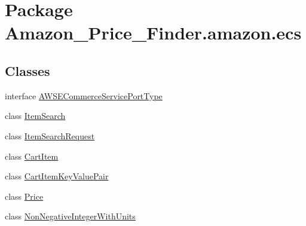\hypertarget{namespace_amazon___price___finder_1_1amazon_1_1ecs}{\section{Package Amazon\-\_\-\-Price\-\_\-\-Finder.\-amazon.\-ecs}
\label{namespace_amazon___price___finder_1_1amazon_1_1ecs}
}
\subsection*{Classes}
\begin{DoxyCompactItemize}
\item 
interface \hyperlink{interface_amazon___price___finder_1_1amazon_1_1ecs_1_1_a_w_s_e_commerce_service_port_type}{A\-W\-S\-E\-Commerce\-Service\-Port\-Type}
\item 
class \hyperlink{class_amazon___price___finder_1_1amazon_1_1ecs_1_1_item_search}{Item\-Search}
\begin{DoxyCompactList}\small\item\em \end{DoxyCompactList}\item 
class \hyperlink{class_amazon___price___finder_1_1amazon_1_1ecs_1_1_item_search_request}{Item\-Search\-Request}
\begin{DoxyCompactList}\small\item\em \end{DoxyCompactList}\item 
class \hyperlink{class_amazon___price___finder_1_1amazon_1_1ecs_1_1_cart_item}{Cart\-Item}
\begin{DoxyCompactList}\small\item\em \end{DoxyCompactList}\item 
class \hyperlink{class_amazon___price___finder_1_1amazon_1_1ecs_1_1_cart_item_key_value_pair}{Cart\-Item\-Key\-Value\-Pair}
\begin{DoxyCompactList}\small\item\em \end{DoxyCompactList}\item 
class \hyperlink{class_amazon___price___finder_1_1amazon_1_1ecs_1_1_price}{Price}
\begin{DoxyCompactList}\small\item\em \end{DoxyCompactList}\item 
class \hyperlink{class_amazon___price___finder_1_1amazon_1_1ecs_1_1_non_negative_integer_with_units}{Non\-Negative\-Integer\-With\-Units}

\end{DoxyCompactItemize}
